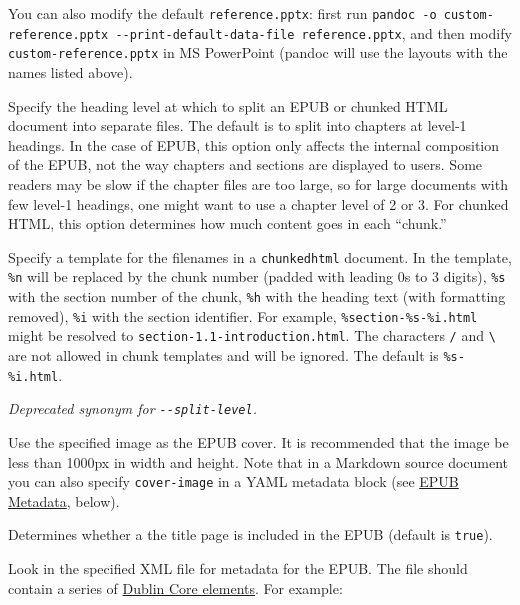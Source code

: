 \documentclass[
  b5paper
]{book}
\begin{document}
\begin{description}
\begin{description}
You can also modify the default \texttt{reference.pptx}: first run
\texttt{pandoc\ -o\ custom-reference.pptx\ -\/-print-default-data-file\ reference.pptx},
and then modify \texttt{custom-reference.pptx} in MS PowerPoint (pandoc
will use the layouts with the names listed above).
\end{description}
\item[\texttt{-\/-split-level=}\emph{NUMBER}]
Specify the heading level at which to split an EPUB or chunked HTML
document into separate files. The default is to split into chapters at
level-1 headings. In the case of EPUB, this option only affects the
internal composition of the EPUB, not the way chapters and sections are
displayed to users. Some readers may be slow if the chapter files are
too large, so for large documents with few level-1 headings, one might
want to use a chapter level of 2 or 3. For chunked HTML, this option
determines how much content goes in each ``chunk.''
\item[\texttt{-\/-chunk-template=}\emph{PATHTEMPLATE}]
Specify a template for the filenames in a \texttt{chunkedhtml} document.
In the template, \texttt{\%n} will be replaced by the chunk number
(padded with leading 0s to 3 digits), \texttt{\%s} with the section
number of the chunk, \texttt{\%h} with the heading text (with formatting
removed), \texttt{\%i} with the section identifier. For example,
\texttt{\%section-\%s-\%i.html} might be resolved to
\texttt{section-1.1-introduction.html}. The characters \texttt{/} and
\texttt{\textbackslash{}} are not allowed in chunk templates and will be
ignored. The default is \texttt{\%s-\%i.html}.
\item[\texttt{-\/-epub-chapter-level=}\emph{NUMBER}]
\emph{Deprecated synonym for \texttt{-\/-split-level}.}
\item[\texttt{-\/-epub-cover-image=}\emph{FILE}]
Use the specified image as the EPUB cover. It is recommended that the
image be less than 1000px in width and height. Note that in a Markdown
source document you can also specify \texttt{cover-image} in a YAML
metadata block (see \hyperref[epub-metadata]{EPUB Metadata}, below).
\item[\texttt{-\/-epub-title-page=true}\textbar{}\texttt{false}]
Determines whether a the title page is included in the EPUB (default is
\texttt{true}).
\item[\texttt{-\/-epub-metadata=}\emph{FILE}]
Look in the specified XML file for metadata for the EPUB. The file
should contain a series of
\href{https://www.dublincore.org/specifications/dublin-core/dces/}{Dublin
Core elements}. For example:


\end{description}
\end{document}
